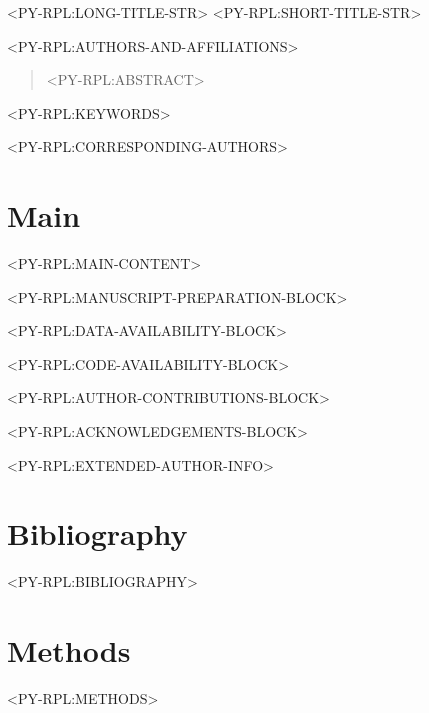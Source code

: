 \documentclass[times, twoside]{rxiv_maker_style}
\begin{document}
<PY-RPL:LONG-TITLE-STR>
<PY-RPL:SHORT-TITLE-STR>

<PY-RPL:AUTHORS-AND-AFFILIATIONS>

\maketitle

\begin{abstract}

<PY-RPL:ABSTRACT>

\end{abstract}

<PY-RPL:KEYWORDS>

<PY-RPL:CORRESPONDING-AUTHORS>

\section*{Main}
<PY-RPL:MAIN-CONTENT>

\vspace{1em}

<PY-RPL:MANUSCRIPT-PREPARATION-BLOCK>

<PY-RPL:DATA-AVAILABILITY-BLOCK>

<PY-RPL:CODE-AVAILABILITY-BLOCK>

<PY-RPL:AUTHOR-CONTRIBUTIONS-BLOCK>

<PY-RPL:ACKNOWLEDGEMENTS-BLOCK>

\begin{exauthor}
<PY-RPL:EXTENDED-AUTHOR-INFO>
\end{exauthor}

\section*{Bibliography}
<PY-RPL:BIBLIOGRAPHY>

\section*{Methods}
<PY-RPL:METHODS>

\onecolumn
\newpage



\end{document}
